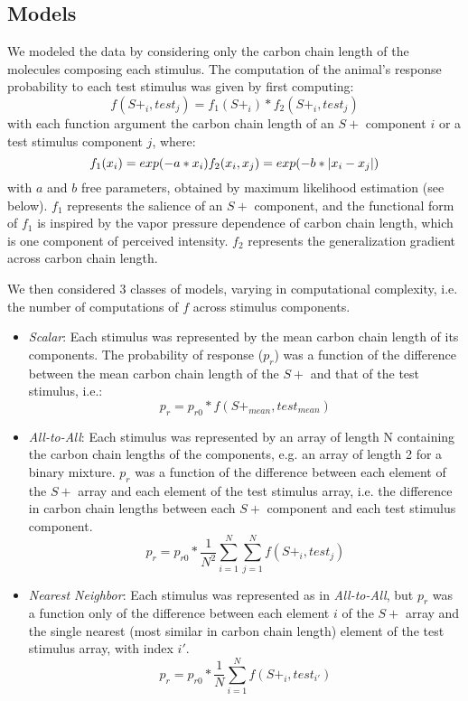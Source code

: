 \subsection*{Models}
\label{sec:methods_models}

We modeled the data by considering only the carbon chain length of the molecules composing each stimulus.  
The computation of the animal's response probability to each test stimulus was given by first computing: 
\begin{equation}
f(S+_i,test_j) = f_1(S+_i) * f_2(S+_i,test_j)
\end{equation}
with each function argument the carbon chain length of an $S+$ component $i$ or a test stimulus component $j$, where:
\begin{equation}
f_1(x_i) = exp(-a*x_i) \\
f_2(x_i,x_j) = exp(-b*|x_i-x_j|)
\end{equation}
with $a$ and $b$ free parameters, obtained by maximum likelihood estimation (see below).  
$f_1$ represents the salience of an $S+$ component, and the functional form of $f_1$ is inspired by the vapor pressure dependence of carbon chain length, which is one component of perceived intensity.  $f_2$ represents the generalization gradient across carbon chain length.  

We then considered 3 classes of models, varying in computational complexity, i.e. the number of computations of $f$ across stimulus components.  
\begin{itemize}
\item \textit{Scalar}: Each stimulus was represented by the mean carbon chain length of its components.  The probability of response ($p_r$) was a function of the difference between the mean carbon chain length of the $S+$ and that of the test stimulus, i.e.:
\begin{equation}
p_r = p_{r0} * f(S+_{mean},test_{mean})
\end{equation}
\item \textit{All-to-All}: Each stimulus was represented by an array of length N containing the carbon chain lengths of the components, e.g. an array of length 2 for a binary mixture. $p_r$ was a function of the difference between each element of the $S+$ array and each element of the test stimulus array, i.e. the difference in carbon chain lengths between each $S+$ component and each test stimulus component.  
\begin{equation}
p_r = p_{r0} * \frac{1}{N^2}\sum_{i=1}^{N}\sum_{j=1}^{N}f(S+_i,test_j)
\end{equation}
\item \textit{Nearest Neighbor}: Each stimulus was represented as in \textit{All-to-All}, but $p_r$ was a function only of the difference between each element $i$ of the $S+$ array and the single nearest (most similar in carbon chain length) element of the test stimulus array, with index $i'$.  
\begin{equation}
p_r = p_{r0} * \frac{1}{N}\sum_{i=1}^{N}f(S+_i,test_{i'})
\end{equation}
\end{itemize}

